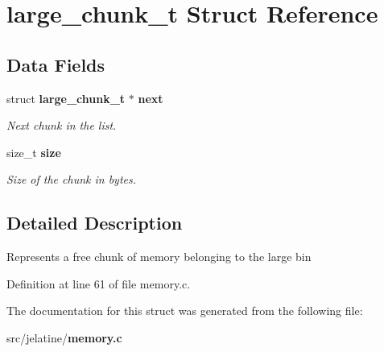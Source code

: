 \section{large\_\-chunk\_\-t Struct Reference}
\label{structlarge__chunk__t}
\subsection*{Data Fields}
\begin{DoxyCompactItemize}
\item 
struct {\bf large\_\-chunk\_\-t} $\ast$ {\bf next}\label{structlarge__chunk__t_abd9aa45ddcdd6d0fc227a5dfcc445bf3}

\begin{DoxyCompactList}\small\item\em Next chunk in the list. \item\end{DoxyCompactList}\item 
size\_\-t {\bf size}\label{structlarge__chunk__t_ad37d6c2f2e94dc0bd5756dde55dea4cc}

\begin{DoxyCompactList}\small\item\em Size of the chunk in bytes. \item\end{DoxyCompactList}\end{DoxyCompactItemize}


\subsection{Detailed Description}
Represents a free chunk of memory belonging to the large bin 

Definition at line 61 of file memory.c.



The documentation for this struct was generated from the following file:\begin{DoxyCompactItemize}
\item 
src/jelatine/{\bf memory.c}\end{DoxyCompactItemize}
